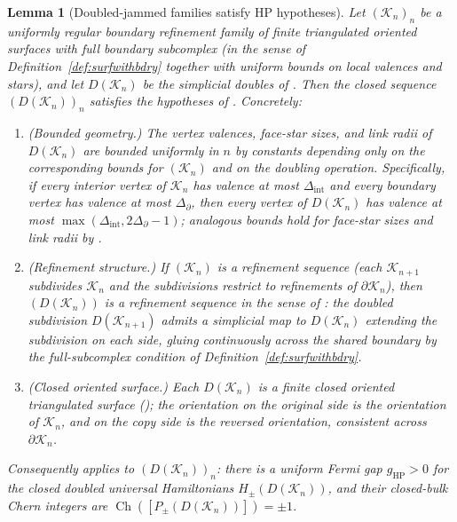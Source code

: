 \documentclass[11pt]{article}
\numberwithin{equation}{section}
\newtheorem{lemma}[theorem]{Lemma}
\theoremstyle{definition}
\theoremstyle{remark}
\newcommand{\K}{\mathcal{K}}
\newcommand{\bd}{\partial}
\newcommand{\Ch}{\operatorname{Ch}}
\begin{document}
\begin{lemma}[Doubled-jammed families satisfy HP hypotheses]\label{lem:hp_hypothesis_check}
Let \((\K_n)_n\) be a uniformly regular boundary refinement family of finite triangulated
oriented surfaces with full boundary subcomplex (in the sense of
Definition~\ref{def:surfwithbdry} together with uniform bounds on local valences and stars),
and let \(D(\K_n)\) be the simplicial doubles of . Then the closed
sequence \((D(\K_n))_n\) satisfies the hypotheses of . Concretely:
\begin{enumerate}[label=(\roman*),leftmargin=2em]
\item (Bounded geometry.) The vertex valences, face-star sizes, and link radii of \(D(\K_n)\)
are bounded uniformly in \(n\) by constants depending only on the corresponding bounds for
\((\K_n)\) and on the doubling operation. Specifically, if every interior vertex of \(\K_n\)
has valence at most \(\Delta_{\mathrm{int}}\) and every boundary vertex has valence at most
\(\Delta_{\bd}\), then every vertex of \(D(\K_n)\) has valence at most
\(\max(\Delta_{\mathrm{int}},2\Delta_{\bd}-1)\); analogous bounds hold for face-star sizes
and link radii by .
\item (Refinement structure.) If \((\K_n)\) is a refinement sequence (each \(\K_{n+1}\)
subdivides \(\K_n\) and the subdivisions restrict to refinements of \(\bd\K_n\)), then
\((D(\K_n))\) is a refinement sequence in the sense of : the doubled
subdivision \(D(\K_{n+1})\) admits a simplicial map to \(D(\K_n)\) extending the subdivision
on each side, gluing continuously across the shared boundary by the full-subcomplex condition
of Definition~\ref{def:surfwithbdry}.
\item (Closed oriented surface.) Each \(D(\K_n)\) is a finite closed oriented triangulated
surface (); the orientation on the original side is the orientation
of \(\K_n\), and on the copy side is the reversed orientation, consistent across \(\bd\K_n\).
\end{enumerate}
Consequently  applies to \((D(\K_n))_n\): there is a uniform Fermi gap
\(g_{\mathrm{HP}}>0\) for the closed doubled universal Hamiltonians \(H_\pm(D(\K_n))\), and
their closed-bulk Chern integers are \(\Ch([P_\pm(D(\K_n))])=\pm 1\).
\end{lemma}
\end{document}
